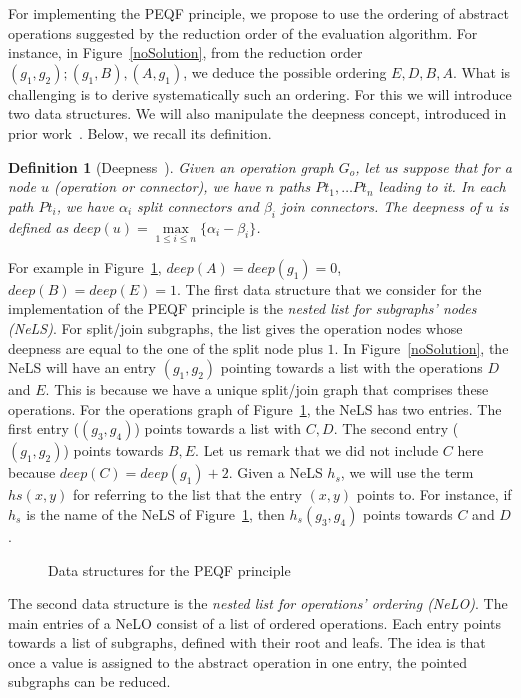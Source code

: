 \documentclass[a4paper]{article}
\newtheorem{definition}{Definition}
\begin{document}
For implementing the PEQF principle, we propose to use the ordering of abstract operations suggested by 
the reduction order of the evaluation algorithm. For instance, in Figure~\ref{noSolution}, from the 
reduction order $(g_1, g_2); (g_1, B), (A, g_1)$, we deduce the possible ordering $E, D, B, A$. 
What is challenging is to derive systematically such an ordering. For this we will  
introduce two data structures. We will also manipulate the deepness concept, introduced in 
prior work~\cite{GoldmanNgoko}. Below, we recall its definition. 
\begin{definition}[Deepness~\cite{GoldmanNgoko}]
Given an operation graph $G_o$, let us suppose that for a node $u$ (operation or connector),  
we have $n$ paths $Pt_1, \dots Pt_n$ leading to it. In each path $Pt_i$, we have $\alpha_i$ 
split connectors and $\beta_i$ join connectors. The deepness of $u$ is defined 
as $deep(u) = \underset{1 \leq i \leq n}{\max} \{\alpha_i - \beta_i\}$.
\end{definition}
For example in Figure~\ref{dataStructure}, $deep(A) = deep(g_1) = 0$, $deep(B) = deep(E) = 1$. 
The first data structure that we consider for the implementation of the PEQF principle is the  
 {\it nested list for subgraphs' nodes (NeLS)}. For split/join subgraphs, the list gives the 
operation nodes whose deepness are equal to the one of the split node plus $1$. In Figure~\ref{noSolution}, 
the NeLS will have an entry $(g_1, g_2)$ pointing towards a list with the operations $D$ and $E$. 
This is because we have a unique split/join graph that comprises these
operations. For the operations graph of Figure~\ref{dataStructure}, the NeLS has two 
entries. The first entry ($(g_3, g_4)$) points towards a list with $C, D$. The second entry ($(g_1, g_2)$) 
points towards $B, E$. Let us remark that we did not include $C$ here because
$deep(C) = deep(g_1)+2$. Given a NeLS $h_s$, we will use the term $hs(x,y)$ for referring 
to the list that the entry $(x,y)$ points to. For instance, if $h_s$ is the name of the NeLS of 
Figure~\ref{dataStructure}, then  $h_s(g_3, g_4)$ points towards $C$ and $D$. 

\begin{figure}[htbp]
\centering
{}
\caption{Data structures for the PEQF principle}\label{dataStructure}
\end{figure}

The second data structure is the {\it nested list for operations' ordering (NeLO)}. The main entries of a NeLO consist 
of a list of ordered operations. Each entry points towards a list of subgraphs, defined with their root 
and leafs. The idea is that once a value is assigned to the abstract operation in one entry, the pointed 
subgraphs can be reduced. 
\end{document}
